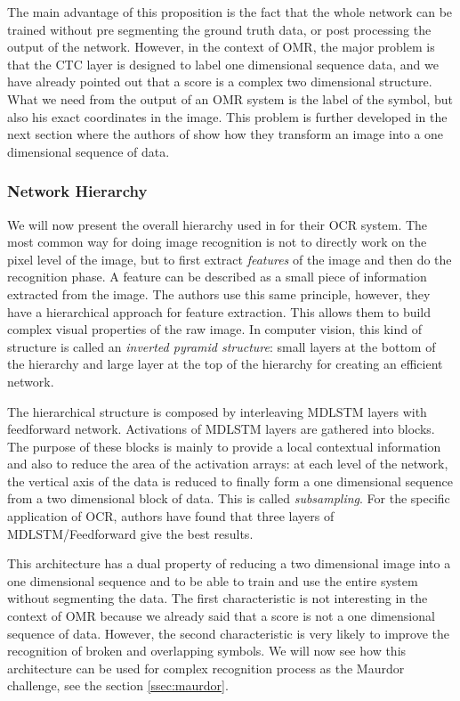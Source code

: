 \documentclass[11pt]{sdm}
\begin{document}
The main advantage of this proposition is the fact that the whole network can be trained without pre segmenting the ground truth data, or post processing the output of the network.
However, in the context of OMR, the major problem is that the CTC layer is designed to label one dimensional sequence data, and we have already pointed out that a score is a complex two dimensional structure.
What we need from the output of an OMR system is the label of the symbol, but also his exact coordinates in the image.
This problem is further developed in the next section where the authors of \cite{graves_offline_2009} show how they transform an image into a one dimensional sequence of data.

\subsubsection{Network Hierarchy}

We will now present the overall hierarchy used in \cite{graves_offline_2009} for their OCR system.
The most common way for doing image recognition is not to directly work on the pixel level of the image, but to first extract \textit{features} of the image and then do the recognition phase.
A feature can be described as a small piece of information extracted from the image.
The authors use this same principle, however, they have a hierarchical approach for feature extraction.
This allows them to build complex visual properties of the raw image.
In computer vision, this kind of structure is called an \textit{inverted pyramid structure}: small layers at the bottom of the hierarchy and large layer at the top of the hierarchy for creating an efficient network.

The hierarchical structure is composed by interleaving MDLSTM layers with feedforward network.
Activations of MDLSTM layers are gathered into blocks.
The purpose of these blocks is mainly to provide a local contextual information and also to reduce the area of the activation arrays: at each level of the network, the vertical axis of the data is reduced to finally form a one dimensional sequence from a two dimensional block of data.
This is called \textit{subsampling}.
For the specific application of OCR, authors have found that three layers of MDLSTM/Feedforward give the best results.

This architecture has a dual property of reducing a two dimensional image into a one dimensional sequence and to be able to train and use the entire system without segmenting the data.
The first characteristic is not interesting in the context of OMR because we already said that a score is not a one dimensional sequence of data.
However, the second characteristic is very likely to improve the recognition of broken and overlapping symbols.
We will now see how this architecture can be used for complex recognition process as the Maurdor challenge, see the section \ref{ssec:maurdor}.
\end{document}
